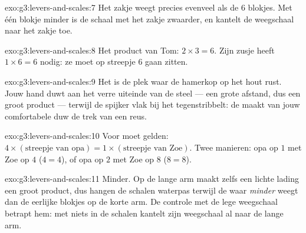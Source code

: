 \begin{solution}{exo:g3:levers-and-scales:7}
Het zakje weegt precies evenveel als de $6$ blokjes. Met één blokje
minder is de schaal met het zakje zwaarder, en kantelt de weegschaal
naar het zakje toe.
\end{solution}

\begin{solution}{exo:g3:levers-and-scales:8}
Het product van Tom: $2 \times 3 = 6$. Zijn zusje heeft
$1 \times 6 = 6$ nodig: ze moet op streepje $6$ gaan zitten.
\end{solution}

\begin{solution}{exo:g3:levers-and-scales:9}
Het  is de plek waar de hamerkop op het hout rust. Jouw hand
duwt aan het verre uiteinde van de steel --- een grote afstand, dus
een groot product --- terwijl de spijker vlak bij het 
tegenstribbelt: de  maakt van jouw comfortabele duw de trek van
een reus.
\end{solution}

\begin{solution}{exo:g3:levers-and-scales:10}
Voor  moet gelden: $4 \times (\text{streepje van opa}) =
1 \times (\text{streepje van Zoe})$. Twee manieren: opa op $1$ met Zoe
op $4$ ($4 = 4$), of opa op $2$ met Zoe op $8$ ($8 = 8$).
\end{solution}

\begin{solution}{exo:g3:levers-and-scales:11}
Minder. Op de lange arm maakt zelfs een lichte lading een groot
product, dus hangen de schalen waterpas terwijl de waar \emph{minder}
weegt dan de eerlijke blokjes op de korte arm. De controle met de lege
weegschaal betrapt hem: met niets in de schalen kantelt zijn
weegschaal al naar de lange arm.
\end{solution}
